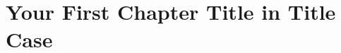 \documentclass[11pt,twoside,openright]{report}
\begin{document}
\doublespacing%

\chapter{Your First Chapter Title in Title Case}

\lipsum%


\end{document}
